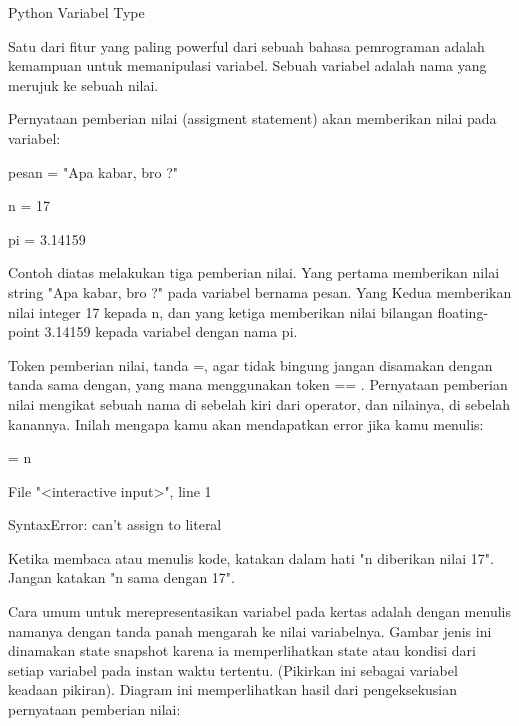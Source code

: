 \sloppy
Python Variabel Type  \par
\noindent 
Satu dari fitur yang paling powerful dari sebuah bahasa pemrograman adalah kemampuan untuk memanipulasi $  $variabel. Sebuah variabel adalah nama yang merujuk ke sebuah nilai. \par
\vspace{12pt}
\noindent 
Pernyataan pemberian nilai $  $(assigment statement) akan memberikan nilai pada variabel: \par
\vspace{12pt}
\noindent 
pesan = "Apa kabar, bro ?" \par
\noindent 
n = 17 \par
\noindent 
pi = 3.14159 \par
\vspace{12pt}
\noindent 
Contoh diatas melakukan tiga pemberian nilai. Yang pertama memberikan nilai string $  $"Apa kabar, bro ?" $  $pada variabel bernama $  $pesan. Yang Kedua memberikan nilai integer $  $17 $  $kepada $  $n, dan yang ketiga memberikan nilai bilangan floating-point $  $3.14159 $  $kepada variabel dengan nama $  $pi. \par
\vspace{12pt}
\noindent 
Token pemberian nilai, tanda $  $=, agar tidak bingung jangan disamakan dengan tanda $  $sama dengan, yang mana menggunakan token $  $== $  $. Pernyataan pemberian nilai mengikat sebuah $  $nama $  $di sebelah kiri dari operator, dan nilainya, di sebelah kanannya. Inilah mengapa kamu akan mendapatkan error jika kamu menulis: \par
\vspace{12pt}
 = n \par
\noindent 
File "<interactive input>", line 1 \par
\noindent 
SyntaxError: can't assign to literal \par
\vspace{12pt}
\noindent 
Ketika membaca atau menulis kode, katakan dalam hati "n diberikan nilai 17". Jangan katakan "n sama dengan 17". \par
\vspace{12pt}
\noindent 
Cara umum untuk merepresentasikan variabel pada kertas adalah dengan menulis namanya dengan tanda panah mengarah ke nilai variabelnya. Gambar jenis ini dinamakan $  $state snapshot $  $karena ia memperlihatkan state atau kondisi dari setiap variabel pada instan waktu tertentu. (Pikirkan ini sebagai variabel keadaan pikiran). Diagram ini memperlihatkan hasil dari pengeksekusian pernyataan pemberian nilai: \par
